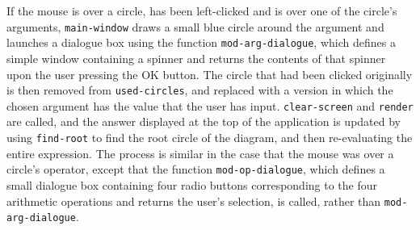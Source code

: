 \documentclass[12pt,twoside,notitlepage,xetex]{report}
\begin{document}
If the mouse is over a circle, has been left-clicked and is over one of the
circle's arguments, \verb¬main-window¬ draws a small blue circle around the
argument and launches a dialogue box using the function
\verb¬mod-arg-dialogue¬, which defines a simple window containing a spinner
and returns the contents of that spinner upon the user pressing the {\sfapp OK}
button.  The circle that had been clicked originally is then removed from
\verb¬used-circles¬, and replaced with a version in which the chosen argument
has the value that the user has input.  \verb¬clear-screen¬ and \verb¬render¬
are called, and the answer displayed at the top of the application is updated
by using \verb¬find-root¬ to find the root circle of the diagram, and then
re-evaluating the entire expression.  The process is similar in the case that
the mouse was over a circle's operator, except that the function
\verb¬mod-op-dialogue¬, which defines a small dialogue box containing four
radio buttons corresponding to the four arithmetic operations and returns the
user's selection, is called, rather than \verb¬mod-arg-dialogue¬.
\end{document}
